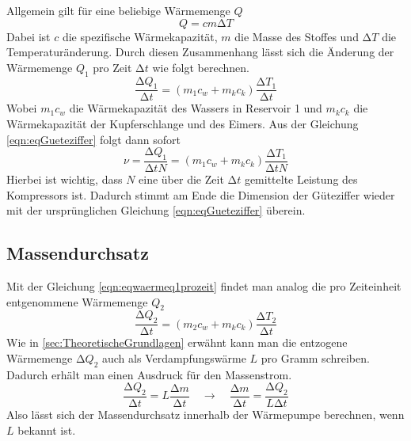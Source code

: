 Allgemein gilt für eine beliebige Wärmemenge $Q$
\begin{equation}
\label{eqn:allgwaerme}
Q = cm \increment T
\end{equation}
Dabei ist $c$ die spezifische Wärmekapazität, $m$ die Masse des Stoffes und $\increment T$ die Temperaturänderung.
Durch diesen Zusammenhang lässt sich die Änderung der Wärmemenge $Q_{1}$ pro Zeit $\increment t$ wie folgt berechnen.
\begin{equation}
\label{eqn:eqwaermeq1prozeit}
\frac{\increment Q_{1}}{\increment t} = (m_{1}c_{w} + m_{k}c_{k})\frac{\increment T_{1}}{\increment t}
\end{equation}
Wobei $m_{1}c_{w}$ die Wärmekapazität des Wassers in Reservoir 1 und $m_{k}c_{k}$ die Wärmekapazität der Kupferschlange und des Eimers.
Aus der Gleichung \eqref{eqn:eqGueteziffer} folgt dann sofort
\begin{equation}
\label{eqn:gueteziffermesswerte}
\nu = \frac{\increment Q_{1}}{\increment t N} = (m_{1}c_{w} + m_{k}c_{k})\frac{\increment T_{1}}{\increment t N}
\end{equation}
Hierbei ist wichtig, dass $N$ eine über die Zeit $\increment t$ gemittelte Leistung des Kompressors ist.
Dadurch stimmt am Ende die Dimension der Güteziffer wieder mit der ursprünglichen Gleichung \eqref{eqn:eqGueteziffer} überein.

\subsection{Massendurchsatz}
\label{sec:massedurchsatz}
Mit der Gleichung \eqref{eqn:eqwaermeq1prozeit} findet man analog die pro Zeiteinheit entgenommene Wärmemenge $Q_{2}$
\begin{equation}
\frac{\increment Q_{2}}{\increment t} = (m_{2}c_{w} + m_{k}c_{k})\frac{\increment T_{2}}{\increment t}
\end{equation}
Wie in \ref{sec:TheoretischeGrundlagen} erwähnt kann man die entzogene Wärmemenge $\increment Q_{2}$ auch als Verdampfungswärme $L$ pro Gramm schreiben.
Dadurch erhält man einen Ausdruck für den Massenstrom.
\begin{equation}
\label{eqn:eqmassendurchsatz}
\frac{\increment Q_{2}}{\increment t} = L \frac{\increment m}{\increment t} \quad \to \quad \frac{\increment m}{\increment t} = \frac{\increment Q_{2}}{L \increment t}
\end{equation}
Also lässt sich der Massendurchsatz innerhalb der Wärmepumpe berechnen, wenn $L$ bekannt ist.

